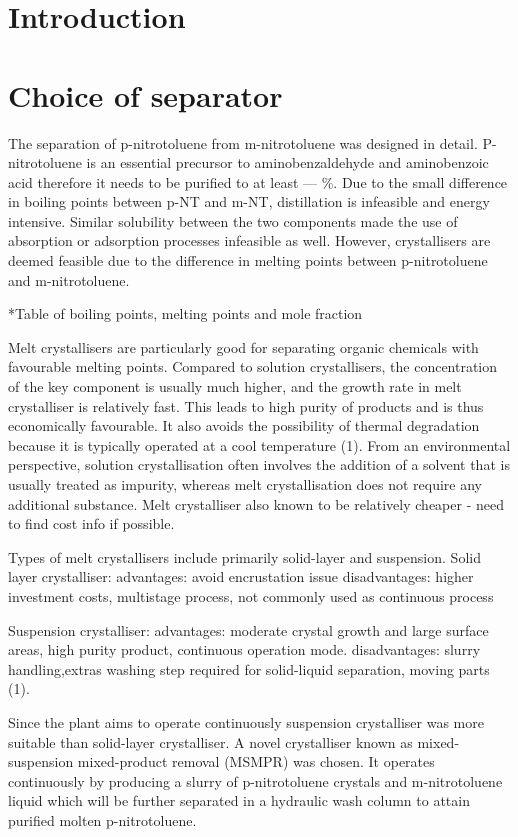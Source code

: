 \section{Introduction}


\section{Choice of separator}
The separation of p-nitrotoluene from m-nitrotoluene was designed in detail. P-nitrotoluene is an essential precursor to aminobenzaldehyde and aminobenzoic acid therefore it needs to be purified to at least --- \%. Due to the small difference in boiling points between p-NT and m-NT, distillation is infeasible and energy intensive. Similar solubility between the two components made the use of absorption or adsorption processes infeasible as well. However, crystallisers are deemed feasible due to the difference in melting points between p-nitrotoluene and m-nitrotoluene.

*Table of boiling points, melting points and mole fraction 

Melt crystallisers are particularly good for separating organic chemicals with favourable melting points. Compared to solution crystallisers, the concentration of the key component is usually much higher, and the growth rate in melt crystalliser is relatively fast. This leads to high purity of products and is thus economically favourable. It also avoids the possibility  of thermal degradation because it is typically operated at a cool temperature (1). From an environmental perspective, solution crystallisation often involves the addition of a solvent that is usually treated as impurity, whereas melt crystallisation does not require any additional substance. Melt crystalliser also known to be relatively cheaper - need to find cost info if possible.

Types of melt crystallisers include primarily solid-layer and suspension. 
Solid layer crystalliser:
advantages: avoid encrustation issue
disadvantages: higher investment costs, multistage process, not commonly used as continuous process

Suspension crystalliser:
advantages: moderate crystal growth and large surface areas, high purity product, continuous operation mode.
disadvantages: slurry handling,extras washing step required for solid-liquid separation, moving parts (1). 

Since the plant aims to operate continuously suspension crystalliser was more suitable than solid-layer crystalliser. A novel crystalliser known as mixed-suspension mixed-product removal (MSMPR) was chosen. It operates continuously by producing a slurry of p-nitrotoluene crystals and m-nitrotoluene liquid which will be further separated in a hydraulic wash column to attain purified molten p-nitrotoluene. 


